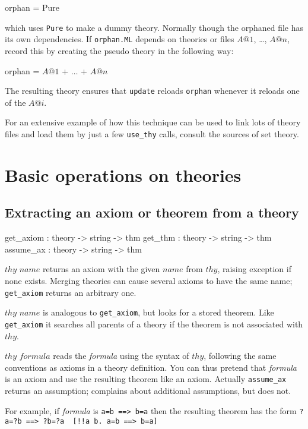 \begin{ttbox}
orphan = Pure
\end{ttbox}

which uses {\tt Pure} to make a dummy theory. Normally though the
orphaned file has its own dependencies.  If {\tt orphan.ML} depends on
theories or files $A@1$, \ldots, $A@n$, record this by creating the
pseudo theory in the following way:
\begin{ttbox}
orphan = \(A@1\) + \(\ldots\) + \(A@n\)
\end{ttbox}
The resulting theory ensures that {\tt update} reloads {\tt orphan}
whenever it reloads one of the $A@i$.

For an extensive example of how this technique can be used to link lots of
theory files and load them by just a few {\tt use_thy} calls, consult the
sources of \ZF{} set theory.



\section{Basic operations on theories}\label{BasicOperationsOnTheories}
\subsection{Extracting an axiom or theorem from a theory}
\begin{ttbox}
get_axiom : theory -> string -> thm
get_thm   : theory -> string -> thm
assume_ax : theory -> string -> thm
\end{ttbox}
\begin{ttdescription}
\item[\ttindexbold{get_axiom} $thy$ $name$]
  returns an axiom with the given $name$ from $thy$, raising exception
   if none exists.  Merging theories can cause several axioms
  to have the same name; {\tt get_axiom} returns an arbitrary one.

\item[\ttindexbold{get_thm} $thy$ $name$]
  is analogous to {\tt get_axiom}, but looks for a stored theorem. Like
  {\tt get_axiom} it searches all parents of a theory if the theorem
  is not associated with $thy$.

\item[\ttindexbold{assume_ax} $thy$ $formula$]
  reads the {\it formula} using the syntax of $thy$, following the same
  conventions as axioms in a theory definition.  You can thus pretend that
  {\it formula} is an axiom and use the resulting theorem like an axiom.
  Actually {\tt assume_ax} returns an assumption;  
  complains about additional assumptions, but  does not.

For example, if {\it formula} is
\hbox{\tt a=b ==> b=a} then the resulting theorem has the form
\hbox{\verb'?a=?b ==> ?b=?a  [!!a b. a=b ==> b=a]'}
\end{ttdescription}

